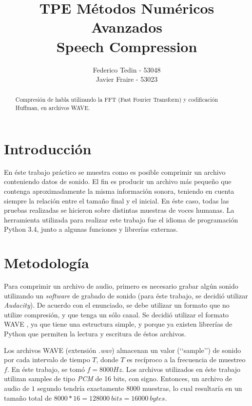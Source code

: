 \documentclass[12pt,a4paper]{article}
\title{TPE Métodos Numéricos Avanzados\\Speech Compression}
\author{Federico Tedin - 53048\\Javier Fraire - 53023}
\begin{document}
\maketitle

\renewcommand{\abstractname}{Resumen:}
\begin{abstract}

\centering
Compresión de habla utilizando la FFT (Fast Fourier Transform) y codificación Huffman, en archivos WAVE.

\end{abstract}

\clearpage
\tableofcontents
\clearpage

\section{Introducción}
En éste trabajo práctico se muestra como es posible comprimir un archivo conteniendo datos de sonido. El fin es producir un archivo más pequeño que contenga aproximadamente la misma información sonora, teniendo en cuenta siempre la relación entre el tamaño final y el inicial.  En éste caso, todas las pruebas realizadas se hicieron sobre distintas muestras de voces humanas.  La herramienta utilizada para realizar este trabajo fue el idioma de programación Python 3.4, junto a algunas funciones y librerías externas.

\section{Metodología}

Para comprimir un archivo de audio, primero es necesario grabar algún sonido utilizando un \emph{software} de grabado de sonido (para éste trabajo, se decidió utilizar \emph{Audacity}).  De acuerdo con el enunciado, se debe utilizar un formato que no utilize compresión, y que tenga un sólo canal.  Se decidió utilizar el formato WAVE \cite{wave}, ya que tiene una estructura simple, y porque ya existen librerías de Python que permiten la lectura y escritura de éstos archivos.

	Los archivos WAVE (extensión \emph{.wav}) almacenan un valor (‘‘sample’’) de sonido por cada intervalo de tiempo $T$, donde $T$ es recíproco a la frecuencia de muestreo $f$.  En éste trabajo, se tomó $f = 8000 Hz$.  Los archivos utilizados en éste trabajo utilizan samples de tipo \emph{PCM} de 16 bits, con signo.  Entonces, un archivo de audio de $1$ segundo tendría exactamente $8000$ muestras, lo cual resultaría en un tamaño total de $8000 * 16 = 128000\: bits = 16000\:	bytes$.
\end{document}
